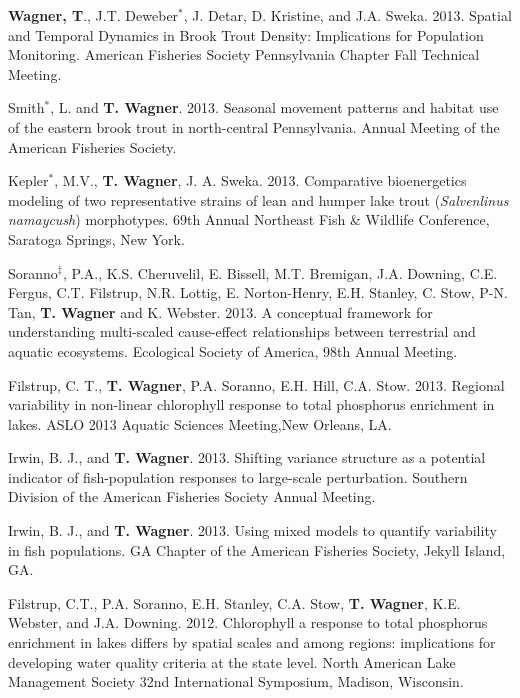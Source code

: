 \documentclass[10pt]{article}
\begin{document}
\begin{flushleft}
\begin{etaremune}
\item {\bf Wagner, T}., J.T. Deweber$^*$, J. Detar, D. Kristine, and J.A. Sweka. 2013. Spatial and Temporal Dynamics in Brook Trout Density: Implications for Population Monitoring. American Fisheries Society Pennsylvania Chapter Fall Technical Meeting.

\item Smith$^*$, L. and {\bf T. Wagner}. 2013. Seasonal movement patterns and habitat use of the eastern brook trout in north-central Pennsylvania. Annual Meeting of the American Fisheries Society.

\item Kepler$^*$, M.V.,  {\bf T. Wagner}, J. A. Sweka. 2013. Comparative bioenergetics modeling of two representative strains of lean and humper lake trout (\emph{Salvenlinus namaycush}) morphotypes. 69th Annual Northeast Fish \& Wildlife Conference, Saratoga Springs, New York. 

\item Soranno$^\ddagger$, P.A., K.S. Cheruvelil, E. Bissell, M.T. Bremigan, J.A. Downing, C.E. Fergus, C.T. Filstrup, N.R. Lottig, E. Norton-Henry, E.H. Stanley, C. Stow, P-N. Tan, {\bf T. Wagner} and K. Webster. 2013. A conceptual framework for understanding multi-scaled cause-effect relationships between terrestrial and aquatic ecosystems. Ecological Society of America, 98th Annual Meeting.

\item Filstrup, C. T., {\bf T. Wagner}, P.A. Soranno, E.H. Hill, C.A. Stow. 2013. Regional variability in non-linear chlorophyll response to total phosphorus enrichment in lakes. ASLO 2013 Aquatic Sciences Meeting,New Orleans, LA.

\item Irwin, B. J., and {\bf T. Wagner}. 2013. Shifting variance structure as a potential indicator of fish-population responses to large-scale perturbation. Southern Division of the American Fisheries Society Annual Meeting.

\item Irwin, B. J., and {\bf T. Wagner}. 2013. Using mixed models to quantify variability in fish populations. GA Chapter of the American Fisheries Society, Jekyll Island, GA.


\item Filstrup, C.T., P.A. Soranno, E.H. Stanley, C.A. Stow, {\bf T. Wagner}, K.E. Webster, and J.A. Downing. 2012. Chlorophyll a response to total phosphorus enrichment in lakes differs by spatial scales and among regions: implications for developing water quality criteria at the state level. North American Lake Management Society 32nd International Symposium, Madison, Wisconsin. 


\end{etaremune}
\end{flushleft}
\end{document}
